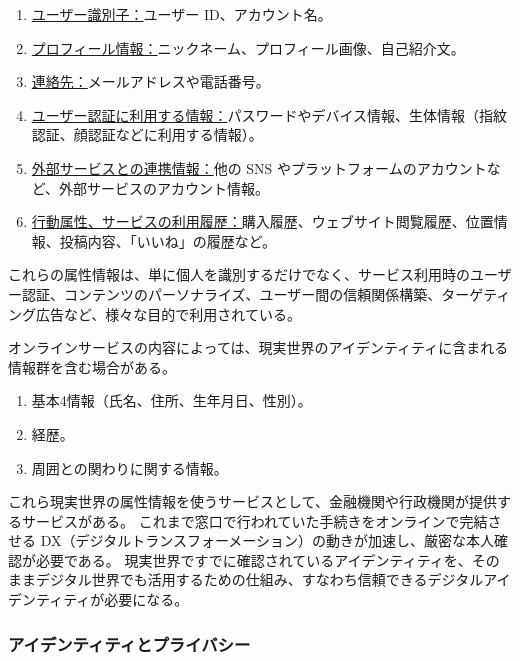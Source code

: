 \documentclass[uplatex]{jsarticle}
\def\label#1{}%
\begin{document}
\begin{exa}[デジタルアイデンティティを構成する主な属性情報]\label{exa:ch1-digital-attributes}
\begin{enumerate}
\item \underline{ユーザー識別子：}ユーザー ID、アカウント名。
\item \underline{プロフィール情報：}ニックネーム、プロフィール画像、自己紹介文。
\item \underline{連絡先：}メールアドレスや電話番号。
\item \underline{ユーザー認証に利用する情報：}パスワードやデバイス情報、生体情報（指紋認証、顔認証などに利用する情報）。
\item \underline{外部サービスとの連携情報：}他の SNS やプラットフォームのアカウントなど、外部サービスのアカウント情報。
\item \underline{行動属性、サービスの利用履歴：}購入履歴、ウェブサイト閲覧履歴、位置情報、投稿内容、「いいね」の履歴など。
\end{enumerate}
\end{exa}

これらの属性情報は、単に個人を識別するだけでなく、サービス利用時のユーザー認証、コンテンツのパーソナライズ、ユーザー間の信頼関係構築、ターゲティング広告など、様々な目的で利用されている。

オンラインサービスの内容によっては、現実世界のアイデンティティに含まれる情報群を含む場合がある。

\begin{exa}[現実世界の属性情報を含むデジタルアイデンティティ]\label{exa:ch1-real-attributes-online}
\begin{enumerate}
\item 基本4情報（氏名、住所、生年月日、性別）。
\item 経歴。
\item 周囲との関わりに関する情報。
\end{enumerate}
\end{exa}

これら現実世界の属性情報を使うサービスとして、金融機関や行政機関が提供するサービスがある。
これまで窓口で行われていた手続きをオンラインで完結させる DX（デジタルトランスフォーメーション）の動きが加速し、厳密な本人確認が必要である。
現実世界ですでに確認されているアイデンティティを、そのままデジタル世界でも活用するための仕組み、すなわち信頼できるデジタルアイデンティティが必要になる。

\subsubsection{アイデンティティとプライバシー}
\end{document}
